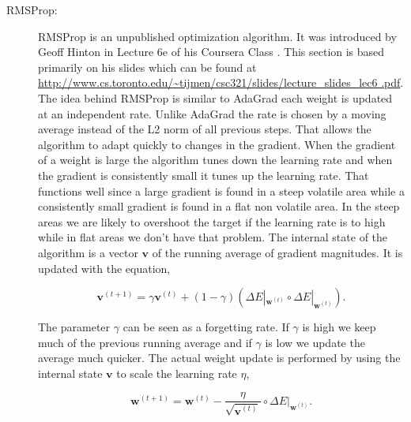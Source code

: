 \begin{description}

    \item[\gls{RMSProp}:]

        \gls{RMSProp} is an unpublished optimization algorithm.
        It was introduced by Geoff Hinton in Lecture 6e of his
        Coursera Class \cite{DBLP:journals/corr/Ruder16}. This section
        is based primarily on his slides which can be found at
        \url{http://www.cs.toronto.edu/~tijmen/csc321/slides/lecture_slides_lec6
        .pdf}. The idea behind \gls{RMSProp} is similar to \gls{AdaGrad} each
        weight is updated at an independent rate. Unlike \gls{AdaGrad} the rate
        is chosen by a moving average instead of the L2 norm of all previous
        steps. That allows the algorithm to adapt quickly to changes in the
        gradient. When the gradient of a weight is large the algorithm tunes
        down the learning rate and when the gradient is consistently small it
        tunes up the learning rate. That functions well since a large gradient
        is found in a steep volatile area while a consistently small gradient is
        found in a flat non volatile area. In the steep areas we are likely to
        overshoot the target if the learning rate is to high while in flat areas
        we don't have that problem. The internal state of the algorithm is a
        vector $\mathbf{v}$ of the running average of gradient magnitudes. It is
        updated with the equation,

        \begin{equation}
            \label{eq:rms_prop_state}
            \mathbf{v}^{(t+1)} =
                \gamma\mathbf{v}^{(t)} +
                (1 - \gamma)\left(
                    \Delta E|_{\mathbf{w}^{(t)}} \circ
                    \Delta E|_{\mathbf{w}^{(t)}}
                \right).
        \end{equation}

        The parameter $\gamma$ can be seen as a forgetting rate. If $\gamma$
        is high we keep much of the previous running average and if $\gamma$
        is low we update the average much quicker. The actual weight update is
        performed by using the internal state $\mathbf{v}$ to scale the learning
        rate $\eta$,

        \begin{equation}
            \mathbf{w}^{(t+1)} =
                \mathbf{w}^{(t)} -
                \frac{\eta}{\sqrt{\mathbf{v}^{(t)}}} \circ
                \Delta E|_{\mathbf{w}^{(t)}}.
        \end{equation}


\end{description}
